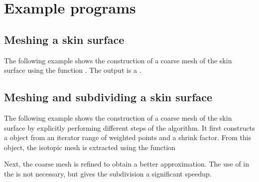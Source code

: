 \section{Example programs}
\subsection{Meshing a skin surface}
The following example shows the construction of a coarse mesh of the
skin surface using the function . The
output is a .

\subsection{Meshing and subdividing a skin surface}
The following example shows the construction of a coarse mesh of the
skin surface by explicitly performing different steps of the
algorithm. It first constructs a  object from an
iterator range of weighted points and a shrink factor. From this
object, the isotopic mesh is extracted using the function

Next, the coarse mesh is refined to obtain a better approximation. The
use of  in
the  is not necessary, but gives the subdivision
a significant speedup.



